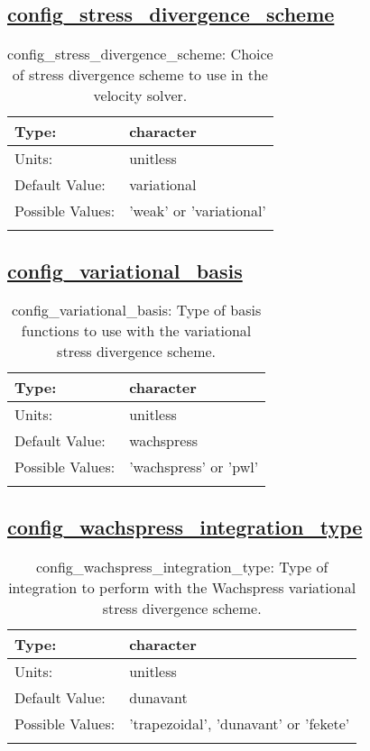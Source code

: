 \subsection[config\_stress\_divergence\_scheme]{\hyperref[sec:nm_tab_velocity_solver]{config\_stress\_divergence\_scheme}}
\label{subsec:nm_sec_config_stress_divergence_scheme}
\begin{center}
\begin{longtable}{| p{2.0in} || p{4.0in} |}
    \hline
    Type: & character \\
    \hline
    Units: & \si{unitless} \\
    \hline
    Default Value: & variational \\
    \hline
    Possible Values: & 'weak' or 'variational' \\
    \hline
    \caption{config\_stress\_divergence\_scheme: Choice of stress divergence scheme to use in the velocity solver.}
\end{longtable}
\end{center}
\subsection[config\_variational\_basis]{\hyperref[sec:nm_tab_velocity_solver]{config\_variational\_basis}}
\label{subsec:nm_sec_config_variational_basis}
\begin{center}
\begin{longtable}{| p{2.0in} || p{4.0in} |}
    \hline
    Type: & character \\
    \hline
    Units: & \si{unitless} \\
    \hline
    Default Value: & wachspress \\
    \hline
    Possible Values: & 'wachspress' or 'pwl' \\
    \hline
    \caption{config\_variational\_basis: Type of basis functions to use with the variational stress divergence scheme.}
\end{longtable}
\end{center}
\subsection[config\_wachspress\_integration\_type]{\hyperref[sec:nm_tab_velocity_solver]{config\_wachspress\_integration\_type}}
\label{subsec:nm_sec_config_wachspress_integration_type}
\begin{center}
\begin{longtable}{| p{2.0in} || p{4.0in} |}
    \hline
    Type: & character \\
    \hline
    Units: & \si{unitless} \\
    \hline
    Default Value: & dunavant \\
    \hline
    Possible Values: & 'trapezoidal', 'dunavant' or 'fekete' \\
    \hline
    \caption{config\_wachspress\_integration\_type: Type of integration to perform with the Wachspress variational stress divergence scheme.}
\end{longtable}
\end{center}

